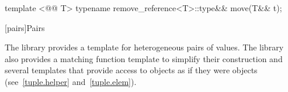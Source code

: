 \documentclass[american,twoside]{book}
\begin{document}
\begin{itemdescr}
\pnum
{}
\end{itemdescr}

\setcounter{Paras}{6}
%
\begin{itemdecl}
template <@@ T> typename remove_reference<T>::type&& move(T&& t);
\end{itemdecl}

\begin{itemdescr}
\pnum
{}
\end{itemdescr}

[pairs]{Pairs}

\pnum
The library provides a template for heterogeneous pairs of values.
The library also provides a matching function template to simplify
their construction and several templates that provide access to 
objects as if they were  objects (see~\ref{tuple.helper}
and~\ref{tuple.elem}).%
%
%
%
\end{document}
